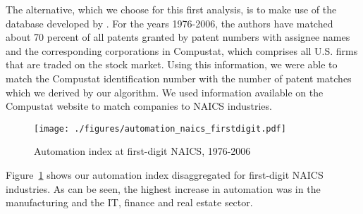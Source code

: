 \documentclass[11pt,a4paper,fleqn]{article}
\begin{document}
The alternative, which we choose for this first analysis, is to make use of the database developed by \cite{HJT2001}. For the years 1976-2006, the authors have matched about 70 percent of all patents granted by patent numbers with assignee names and the corresponding corporations in Compustat, which comprises all U.S. firms that are traded on the stock market. Using this information, we were able to match the Compustat identification number with the number of patent matches which we derived by our algorithm. We used information available on the Compustat website to match companies to NAICS industries. 

\begin{figure}[tb]
	\caption{Automation index at first-digit NAICS, 1976-2006}
	\centering
	\texttt{[image: ./figures/automation\_naics\_firstdigit.pdf]}\\
	\label{fig:automation_naics_firstdigit}
\end{figure}


Figure~\ref{fig:automation_naics_firstdigit} shows our automation index disaggregated for first-digit NAICS industries. As can be seen, the highest increase in automation was in the manufacturing and the IT, finance and real estate sector. 




\end{document}
